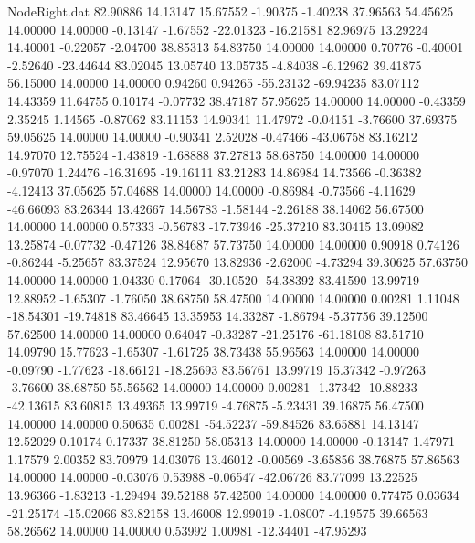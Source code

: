 \begin{filecontents}{NodeRight.dat}
  82.90886   14.13147   15.67552    -1.90375   -1.40238   37.96563   54.45625   14.00000   14.00000   -0.13147   -1.67552  -22.01323  -16.21581
  82.96975   13.29224   14.40001    -0.22057   -2.04700   38.85313   54.83750   14.00000   14.00000    0.70776   -0.40001   -2.52640  -23.44644
  83.02045   13.05740   13.05735    -4.84038   -6.12962   39.41875   56.15000   14.00000   14.00000    0.94260    0.94265  -55.23132  -69.94235
  83.07112   14.43359   11.64755     0.10174   -0.07732   38.47187   57.95625   14.00000   14.00000   -0.43359    2.35245    1.14565   -0.87062
  83.11153   14.90341   11.47972    -0.04151   -3.76600   37.69375   59.05625   14.00000   14.00000   -0.90341    2.52028   -0.47466  -43.06758
  83.16212   14.97070   12.75524    -1.43819   -1.68888   37.27813   58.68750   14.00000   14.00000   -0.97070    1.24476  -16.31695  -19.16111
  83.21283   14.86984   14.73566    -0.36382   -4.12413   37.05625   57.04688   14.00000   14.00000   -0.86984   -0.73566   -4.11629  -46.66093
  83.26344   13.42667   14.56783    -1.58144   -2.26188   38.14062   56.67500   14.00000   14.00000    0.57333   -0.56783  -17.73946  -25.37210
  83.30415   13.09082   13.25874    -0.07732   -0.47126   38.84687   57.73750   14.00000   14.00000    0.90918    0.74126   -0.86244   -5.25657
  83.37524   12.95670   13.82936    -2.62000   -4.73294   39.30625   57.63750   14.00000   14.00000    1.04330    0.17064  -30.10520  -54.38392
  83.41590   13.99719   12.88952    -1.65307   -1.76050   38.68750   58.47500   14.00000   14.00000    0.00281    1.11048  -18.54301  -19.74818
  83.46645   13.35953   14.33287    -1.86794   -5.37756   39.12500   57.62500   14.00000   14.00000    0.64047   -0.33287  -21.25176  -61.18108
  83.51710   14.09790   15.77623    -1.65307   -1.61725   38.73438   55.96563   14.00000   14.00000   -0.09790   -1.77623  -18.66121  -18.25693
  83.56761   13.99719   15.37342    -0.97263   -3.76600   38.68750   55.56562   14.00000   14.00000    0.00281   -1.37342  -10.88233  -42.13615
  83.60815   13.49365   13.99719    -4.76875   -5.23431   39.16875   56.47500   14.00000   14.00000    0.50635    0.00281  -54.52237  -59.84526
  83.65881   14.13147   12.52029     0.10174    0.17337   38.81250   58.05313   14.00000   14.00000   -0.13147    1.47971    1.17579    2.00352
  83.70979   14.03076   13.46012    -0.00569   -3.65856   38.76875   57.86563   14.00000   14.00000   -0.03076    0.53988   -0.06547  -42.06726
  83.77099   13.22525   13.96366    -1.83213   -1.29494   39.52188   57.42500   14.00000   14.00000    0.77475    0.03634  -21.25174  -15.02066
  83.82158   13.46008   12.99019    -1.08007   -4.19575   39.66563   58.26562   14.00000   14.00000    0.53992    1.00981  -12.34401  -47.95293

\end{filecontents}
